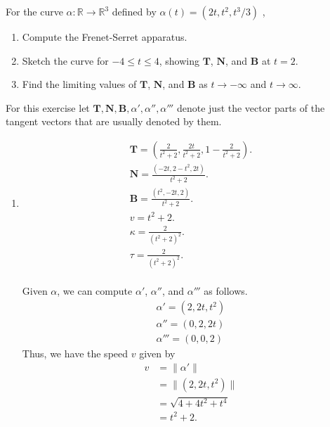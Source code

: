 \documentclass[12 pt, letterpaper]{hmcpset}
\begin{document}
\begin{problem}[Problem 1.]
	 For the curve $\alpha : \mathbb{R} \to \mathbb{R}^{3}$  defined by $\alpha(t) = (2t, t^{2}, t^{3}/3)$ ,
	\begin{enumerate}
		\item Compute the Frenet-Serret apparatus.
		\item Sketch the curve for $-4 \le t \le 4$, showing $\mathbf{T}$, $\mathbf{N}$, and $\mathbf{B}$ at $t = 2$.
		\item Find the limiting values of $\mathbf{T}$, $\mathbf{N}$, and $\mathbf{B}$ as $t \to - \infty$ and $t \to \infty$.
	\end{enumerate} 
\end{problem}

\begin{solution}
	For this exercise let $\mathbf{T}, \mathbf{N}, \mathbf{B}, \alpha', \alpha'', \alpha'''$ denote just the vector parts of the tangent vectors that are usually denoted by them.
	\begin{enumerate}
		\item
			\[
				\boxed{
					\begin{gathered}
						\mathbf{T} = \left ( \frac{2}{t^{2} + 2}, \frac{2t}{t^{2} + 2}, 1 - \frac{2}{t^{2} + 2} \right ). \\
						\mathbf{N} = \frac{(-2t, 2 - t^{2}, 2t)}{t^{2} + 2}. \\
						\mathbf{B} = \frac{(t^{2}, -2t, 2)}{t^{2} + 2}. \\
						v = t^{2} + 2. \\
						\kappa = \frac{2}{(t^{2} + 2)^{2}}. \\
						\tau = \frac{2}{(t^{2} + 2)^{2}}.
					\end{gathered}
				}
			\] \\
			Given $\alpha$, we can compute $\alpha'$, $\alpha''$, and $\alpha'''$ as follows.
			\[
				\begin{gathered}
					\alpha' = (2, 2t, t^{2}) \\
					\alpha'' = (0, 2, 2t) \\
					\alpha''' = (0, 0, 2)
				\end{gathered}
			\]
			Thus, we have the speed $v$ given by
			\[
				\begin{split}
					v & = \lVert \alpha' \rVert \\
					  & = \lVert (2, 2t, t^{2}) \rVert \\
					  & = \sqrt{4 + 4t^{2} + t^{4}} \\
					  & = t^{2} + 2.

\end{split}\]
\end{enumerate}
\end{solution}
\end{document}
